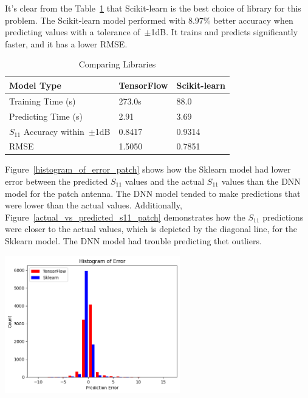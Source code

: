 \documentclass[lettersize,journal]{IEEEtran}
\newenvironment{Figure}
    {\par\medskip\noindent\minipage{\linewidth}}
    {\endminipage\par\medskip}
\begin{document}
It's clear from the Table~\ref{comparing_libraries} that Scikit-learn is the best choice of library for this problem. The Scikit-learn model performed with 8.97\% better accuracy when predicting values with a tolerance of~$\pm$1dB. It trains and predicts significantly faster, and it has a lower RMSE.

\begin{table}[h]
\caption{Comparing Libraries}
\begin{center}
\begin{tabular}{ |l|l|l| }
    \hline
    Model Type & TensorFlow & Scikit-learn \\ 
    \hline
    Training Time (s) & 273.0s & 88.0 \\  
    \hline
    Predicting Time (s) & 2.91 & 3.69 \\
    \hline
    $S_{11}$ Accuracy within~$\pm$1dB & 0.8417 & 0.9314 \\
    \hline
    RMSE & 1.5050 & 0.7851 \\
    \hline
\end{tabular}
\end{center}
\label{comparing_libraries}
\end{table}

Figure~\ref{histogram_of_error_patch} shows how the Sklearn model had lower error between the predicted $S_{11}$ values and the actual $S_{11}$ values than the DNN model for the patch antenna. The DNN model tended to make predictions that were lower than the actual values. Additionally, Figure~\ref{actual_vs_predicted_s11_patch} demonstrates how the $S_{11}$ predictions were closer to the actual values, which is depicted by the diagonal line, for the Sklearn model. The DNN model had trouble predicting thet outliers. 

\begin{Figure}
    \centering
    \includegraphics[width=3in]{histogram_patch}
    \label{histogram_of_error_patch}
\end{Figure}
\end{document}
